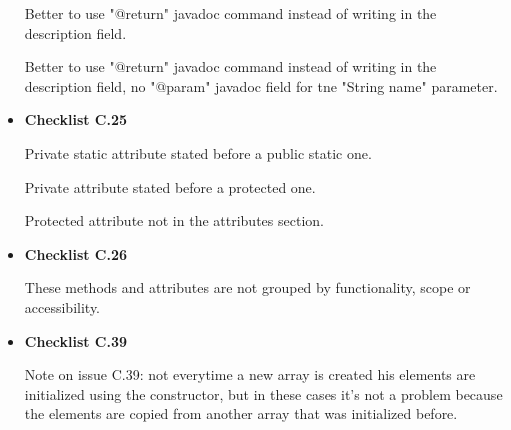 \documentclass[../../../../codeInspection.tex]{subfiles}
\begin{document}
\begin{itemize}
		    	  

		    	  

		    	  

		    	  Better to use "@return" javadoc command instead of writing in the description field.

		    	  

		    	  Better to use "@return" javadoc command instead of writing in the description field, no "@param" javadoc field for tne "String name" parameter.

		    \item \textbf{Checklist C.25}

		    	  

		    	  Private static attribute stated before a public static one.

		    	  

		    	  

		    	  

		    	  

		    	  Private attribute stated before a protected one.

		    	  

		    	  Protected attribute not in the attributes section.

		    \item \textbf{Checklist C.26}

		    	  

		    	  These methods and attributes are not grouped by functionality, scope or accessibility.

		    \item \textbf{Checklist C.39}

		    	  Note on issue C.39: not everytime a new array is created his elements are initialized using the constructor, but in these cases it's not a problem because the elements are copied from another array that was initialized before.

		\end{itemize}
\end{document}
